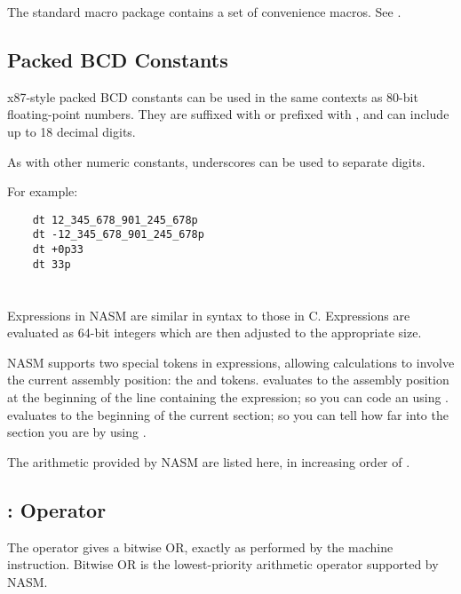 The  standard macro package contains a set of convenience
macros. See .

\subsection{Packed BCD Constants}
\label{subsec:bcdconst}

x87-style packed BCD constants can be used in the same contexts as
80-bit floating-point numbers. They are suffixed with  or
prefixed with , and can include up to 18 decimal digits.

As with other numeric constants, underscores can be used
to separate digits.

For example:

\begin{lstlisting}
	dt 12_345_678_901_245_678p
	dt -12_345_678_901_245_678p
	dt +0p33
	dt 33p
\end{lstlisting}

\section{}
\label{sec:expr}

Expressions in NASM are similar in syntax to those in C. Expressions
are evaluated as 64-bit integers which are then adjusted to the
appropriate size.

NASM supports two special tokens in expressions, allowing
calculations to involve the current assembly position: the
\index{\$}\code{\$} and \codeindex{\$\$} tokens.
\code{\$} evaluates to the assembly position at the beginning
of the line containing the expression; so you can code an
 using . \code{\$\$}
evaluates to the beginning of the current section; so you can
tell how far into the section you are by using \code{(\$-\$\$)}.

The arithmetic  provided by NASM are listed here,
in increasing order of .

\subsection{\codeindex{|}:  Operator}
\label{subsec:expor}

The \code{|} operator gives a bitwise OR, exactly as performed by the
 machine instruction. Bitwise OR is the lowest-priority
arithmetic operator supported by NASM.

